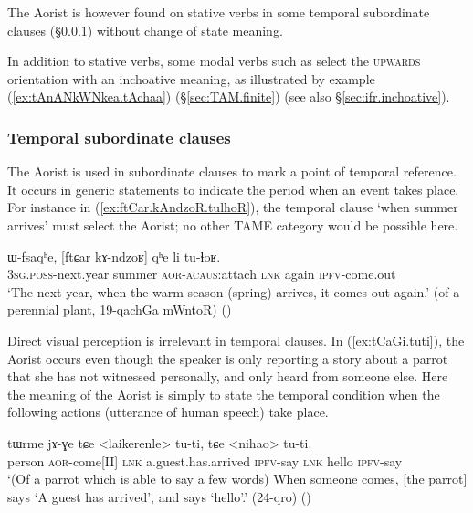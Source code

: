 The Aorist is however found on stative verbs in some temporal subordinate clauses (§\ref{sec:aor.temporal}) without change of state meaning. 

In addition to stative verbs, some modal verbs such as  select the \textsc{upwards} orientation with an inchoative meaning, as illustrated by example (\ref{ex:tAnANkWNkea.tAchaa}) (§\ref{sec:TAM.finite}) (see also §\ref{sec:ifr.inchoative}).
 


\subsubsection{Temporal subordinate clauses }   \label{sec:aor.temporal}
The Aorist is used in subordinate clauses to mark a point of temporal reference. It occurs in generic statements to indicate the period when an event takes place. For instance in  (\ref{ex:ftCar.kAndzoR.tulhoR}), the temporal clause  `when summer arrives' must select the Aorist; no other TAME category would be possible here.

\begin{exe}
\ex \label{ex:ftCar.kAndzoR.tulhoR}
 \gll ɯ-fsaqʰe, [ftɕar kɤ-ndzoʁ] qʰe li tu-ɬoʁ. \\
 \textsc{3sg}.\textsc{poss}-next.year summer \textsc{aor}-\textsc{acaus}:attach \textsc{lnk} again \textsc{ipfv}-come.out \\
 \glt `The next year, when the warm season (spring) arrives, it comes out again.' (of a perennial plant, 19-qachGa mWntoR)
()
\end{exe}

Direct visual perception is irrelevant in temporal clauses. In (\ref{ex:tCaGi.tuti}), the Aorist  occurs even though the speaker is only reporting a story about a parrot that she has not witnessed personally, and only heard from someone else. Here the meaning of the Aorist is simply to state the temporal condition when the following actions (utterance of human speech) take place.

\begin{exe}
\ex \label{ex:tCaGi.tuti}
 \gll tɯrme jɤ-ɣe tɕe <laikerenle> tu-ti, tɕe <nihao>  tu-ti. \\
 person \textsc{aor}-come[II] \textsc{lnk} a.guest.has.arrived \textsc{ipfv}-say \textsc{lnk} hello \textsc{ipfv}-say  \\
 \glt `(Of a parrot which is able to say a few words) When someone comes, [the parrot] says `A guest has arrived', and says `hello'.' (24-qro) ()
\end{exe}
 
